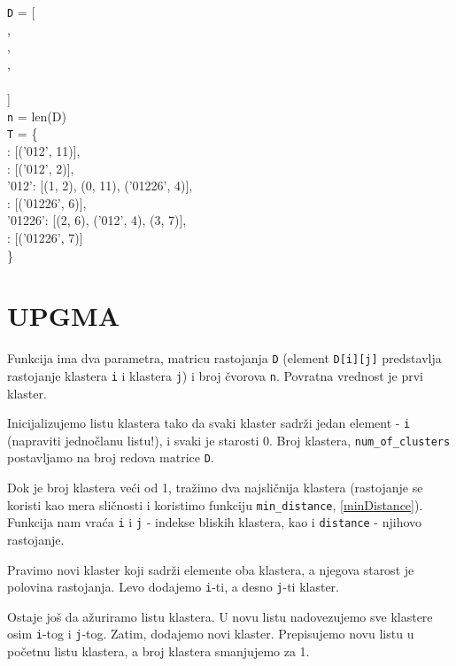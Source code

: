 \noindent \texttt{D} = [
\\\indent[0,  13, 21, 22],
\\\indent[13,  0, 12, 13],
\\\indent[21, 12,  0, 13],
\\\indent[22, 13, 13,  0]
\\]
\\\texttt{n} = len(D)
\\\texttt{T} = \{\\: [('012', 11)], 
\\: [('012', 2)], 
\\\indent'012': [(1, 2), (0, 11), ('01226', 4)], 
\\: [('01226', 6)], 
\\\indent'01226': [(2, 6), ('012', 4), (3, 7)], 
\\: [('01226', 7)]\\\indent\}


\section{UPGMA}

Funkcija ima dva parametra, matricu rastojanja \texttt{D} (element \texttt{D[i][j]} predstavlja rastojanje klastera \texttt{i} i klastera \texttt{j}) i broj čvorova \texttt{n}. Povratna vrednost je prvi klaster.

Inicijalizujemo listu klastera tako da svaki klaster sadrži jedan element - \texttt{i} (napraviti jednočlanu listu!), i svaki je starosti 0. Broj klastera, \texttt{num\_of\_clusters} postavljamo na broj redova matrice \texttt{D}.

Dok je broj klastera veći od 1, tražimo dva najsličnija klastera (rastojanje se koristi kao mera sličnosti i koristimo funkciju \texttt{min\_distance}, \ref{minDistance}). Funkcija nam vraća \texttt{i} i \texttt{j} - indekse bliskih klastera, kao i \texttt{distance} - njihovo rastojanje. 

Pravimo novi klaster koji sadrži elemente oba klastera, a njegova starost je polovina rastojanja. Levo dodajemo \texttt{i}-ti, a desno \texttt{j}-ti klaster. 

Ostaje još da ažuriramo listu klastera. U novu listu nadovezujemo sve klastere osim \texttt{i}-tog i \texttt{j}-tog. Zatim, dodajemo novi klaster. Prepisujemo novu listu u početnu listu klastera, a broj klastera smanjujemo za 1.

\newpage



